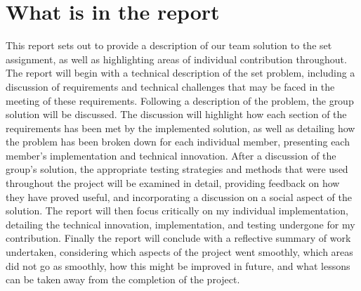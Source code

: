 \section{What is in the report}

This report sets out to provide a description of our team solution to the set 
assignment, as well as highlighting areas of individual contribution throughout.
The report will begin with a technical description of the set problem, 
including a discussion of requirements and technical challenges that may be 
faced in the meeting of these requirements. 
Following a description of the problem, the group solution will be discussed. 
The discussion will highlight how each section of the requirements has been met 
by the implemented solution, as well as detailing how the problem has been broken 
down for each individual member, presenting each member's implementation and 
technical innovation. 
After a discussion of the group's solution, the appropriate testing strategies 
and methods that were used throughout the project will be examined in detail, 
providing feedback on how they have proved useful, and incorporating a 
discussion on a social aspect of the solution.
The report will then focus critically on my individual implementation, 
detailing the technical innovation, implementation, and testing undergone for my 
contribution. 
Finally the report will conclude with a reflective summary of work 
undertaken, considering which aspects of the project went smoothly, which areas
did not go as smoothly, how this might be improved in future, and what lessons 
can be taken away from the completion of the project. 
